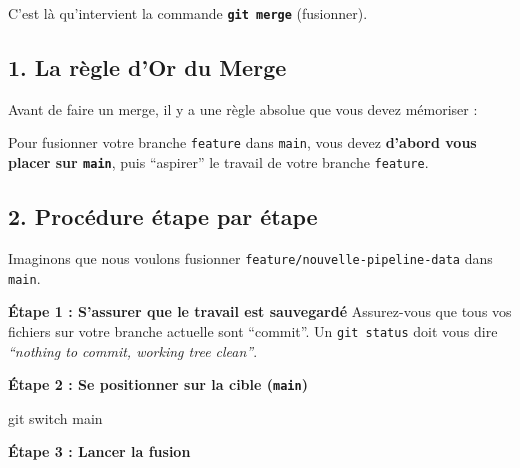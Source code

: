 \documentclass[
  letterpaper,
  DIV=11,
  numbers=noendperiod]{scrreprt}
\newenvironment{Shaded}{\begin{snugshade}}{\end{snugshade}}
\newcommand{\FunctionTok}[1]{\textcolor[rgb]{0.28,0.35,0.67}{#1}}
\newcommand{\NormalTok}[1]{\textcolor[rgb]{0.00,0.23,0.31}{#1}}
\begin{document}
C'est là qu'intervient la commande \textbf{\texttt{git\ merge}}
(fusionner).

\subsection{1. La règle d'Or du Merge}\label{la-ruxe8gle-dor-du-merge}

Avant de faire un merge, il y a une règle absolue que vous devez
mémoriser :

\begin{tcolorbox}[enhanced jigsaw, arc=.35mm, bottomrule=.15mm, bottomtitle=1mm, breakable, colback=white, colbacktitle=quarto-callout-important-color!10!white, colframe=quarto-callout-important-color-frame, coltitle=black, left=2mm, leftrule=.75mm, opacityback=0, opacitybacktitle=0.6, rightrule=.15mm, title=\textcolor{quarto-callout-important-color}{\faExclamation}\hspace{0.5em}{On fusionne TOUJOURS ``vers'' la cible}, titlerule=0mm, toprule=.15mm, toptitle=1mm]

Pour fusionner votre branche \texttt{feature} dans \texttt{main}, vous
devez \textbf{d'abord vous placer sur \texttt{main}}, puis ``aspirer''
le travail de votre branche \texttt{feature}.

\end{tcolorbox}

\subsection{2. Procédure étape par
étape}\label{procuxe9dure-uxe9tape-par-uxe9tape}

Imaginons que nous voulons fusionner
\texttt{feature/nouvelle-pipeline-data} dans \texttt{main}.

\textbf{Étape 1 : S'assurer que le travail est sauvegardé} Assurez-vous
que tous vos fichiers sur votre branche actuelle sont ``commit''. Un
\texttt{git\ status} doit vous dire \emph{``nothing to commit, working
tree clean''}.

\textbf{Étape 2 : Se positionner sur la cible (\texttt{main})}

\begin{Shaded}
\begin{Highlighting}[]
\FunctionTok{git}\NormalTok{ switch main}
\end{Highlighting}
\end{Shaded}

\textbf{Étape 3 : Lancer la fusion}
\end{document}
